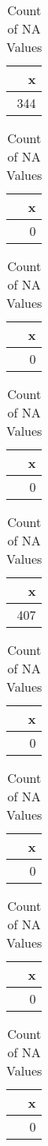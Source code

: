 \documentclass[]{article}
\begin{document}
\begin{table}
\caption{Count of NA Values}

\centering
\begin{tabular}[t]{r}
\hline
x\\
\hline
344\\
\hline
\end{tabular}
\centering
\begin{tabular}[t]{r}
\hline
x\\
\hline
0\\
\hline
\end{tabular}
\centering
\begin{tabular}[t]{r}
\hline
x\\
\hline
0\\
\hline
\end{tabular}
\centering
\begin{tabular}[t]{r}
\hline
x\\
\hline
0\\
\hline
\end{tabular}
\centering
\begin{tabular}[t]{r}
\hline
x\\
\hline
407\\
\hline
\end{tabular}
\centering
\begin{tabular}[t]{r}
\hline
x\\
\hline
0\\
\hline
\end{tabular}
\centering
\begin{tabular}[t]{r}
\hline
x\\
\hline
0\\
\hline
\end{tabular}
\centering
\begin{tabular}[t]{r}
\hline
x\\
\hline
0\\
\hline
\end{tabular}
\centering
\begin{tabular}[t]{r}
\hline
x\\
\hline
0\\
\hline
\end{tabular}
\end{table}
\end{document}
